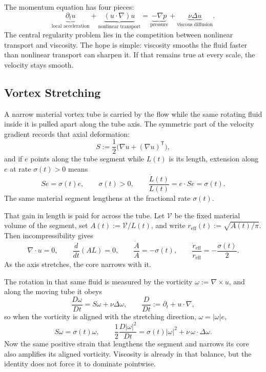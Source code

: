 
The momentum equation has four pieces:
\[
  \underbrace{\partial_t u}_{\text{local acceleration}}
  +
  \underbrace{(u\cdot\nabla)u}_{\text{nonlinear transport}}
  =
  \underbrace{-\nabla p}_{\text{pressure}}
  +
  \underbrace{\nu\Delta u}_{\text{viscous diffusion}}.
\]
The central regularity problem lies in the competition between nonlinear transport and viscosity.
The hope is simple: viscosity smooths the fluid faster than nonlinear transport can sharpen it.
If that remains true at every scale, the velocity stays smooth.

\subsection{Vortex Stretching}\label{sub:ThePerfectlyStretchingVortex}

A narrow material vortex tube is carried by the flow while the same rotating fluid inside it is pulled apart along the tube axis. The symmetric part of the velocity gradient records that axial deformation:
\[
  S:=\frac12\bigl(\nabla u+(\nabla u)^{\mathsf T}\bigr),
\]
and if \(e\) points along the tube segment while \(L(t)\) is its length, extension along \(e\) at rate \(\sigma(t)>0\) means
\[
  Se=\sigma(t)e,
  \qquad
  \sigma(t)>0,
  \qquad
  \frac{\dot L(t)}{L(t)}
  =
  e\cdot Se
  =
  \sigma(t).
\]
The same material segment lengthens at the fractional rate \(\sigma(t)\).

That gain in length is paid for across the tube. Let \(\mathcal V\) be the fixed material volume of the segment, set \(A(t):=\mathcal V/L(t)\), and write \(r_{\mathrm{eff}}(t):=\sqrt{A(t)/\pi}\). Then incompressibility gives
\[
  \nabla\cdot u=0,
  \qquad
  \frac{d}{dt}(A L)=0,
  \qquad
  \frac{\dot A}{A}=-\sigma(t),
  \qquad
  \frac{\dot r_{\mathrm{eff}}}{r_{\mathrm{eff}}}
  =
  -\frac{\sigma(t)}{2}.
\]
As the axis stretches, the core narrows with it.

The rotation in that same fluid is measured by the vorticity \(\omega:=\nabla\times u\), and along the moving tube it obeys
\[
  \frac{D\omega}{Dt}
  =
  S\omega+\nu\Delta\omega,
  \qquad
  \frac{D}{Dt}
  :=
  \partial_t+u\cdot\nabla,
\]
so when the vorticity is aligned with the stretching direction, \(\omega=|\omega|e\),
\[
  S\omega
  =
  \sigma(t)\omega,
  \qquad
  \frac12\frac{D|\omega|^2}{Dt}
  =
  \sigma(t)|\omega|^2
  +
  \nu\,\omega\cdot\Delta\omega.
\]
Now the same positive strain that lengthens the segment and narrows its core also amplifies its aligned vorticity. Viscosity is already in that balance, but the identity does not force it to dominate pointwise.

